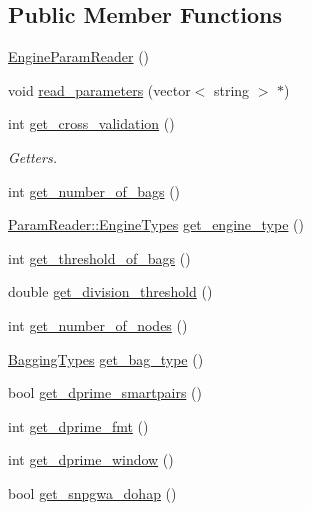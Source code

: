 \subsection*{Public Member Functions}
\begin{DoxyCompactItemize}
\item 
\hyperlink{classEngineParamReader_a0fcc8aa5dcc6a42dc88e94f7177d4322}{EngineParamReader} ()
\item 
void \hyperlink{classEngineParamReader_a6205586b208453840260a6203f605037}{read\_\-parameters} (vector$<$ string $>$ $\ast$)
\item 
int \hyperlink{classEngineParamReader_a1c0d37ffe417acf63b4eec01ca0d3836}{get\_\-cross\_\-validation} ()
\begin{DoxyCompactList}\small\item\em Getters. \item\end{DoxyCompactList}\item 
int \hyperlink{classEngineParamReader_a4338ed4d4978b04d6368cb10da68ccbd}{get\_\-number\_\-of\_\-bags} ()
\item 
\hyperlink{classParamReader_ade771142042ad0251f905f38248ae9df}{ParamReader::EngineTypes} \hyperlink{classEngineParamReader_a0e58d3172ab16c243a207651cb39cae0}{get\_\-engine\_\-type} ()
\item 
int \hyperlink{classEngineParamReader_aaf990b2dfcdb336b1ae0ee368518bca5}{get\_\-threshold\_\-of\_\-bags} ()
\item 
double \hyperlink{classEngineParamReader_af2226b8cad9a09be1acb47244266ce70}{get\_\-division\_\-threshold} ()
\item 
int \hyperlink{classEngineParamReader_a70ca973f1da2ca59547f9ac87ed83558}{get\_\-number\_\-of\_\-nodes} ()
\item 
\hyperlink{classEngineParamReader_ab2ee80aa67ba657beddf852c526e1a3d}{BaggingTypes} \hyperlink{classEngineParamReader_a73bbd8a96eb9c000aace5cb69d899f34}{get\_\-bag\_\-type} ()
\item 
bool \hyperlink{classEngineParamReader_a466e0c76542221a4e0d98b91a670cc75}{get\_\-dprime\_\-smartpairs} ()
\item 
int \hyperlink{classEngineParamReader_a1bf555e1267a06976f5241e8aa46e5d9}{get\_\-dprime\_\-fmt} ()
\item 
int \hyperlink{classEngineParamReader_a27e98726d5628e58e036c5f3a5d53a8f}{get\_\-dprime\_\-window} ()
\item 
bool \hyperlink{classEngineParamReader_ac4beadc882ffad47d90c2a4a6b6f1b44}{get\_\-snpgwa\_\-dohap} ()

\end{DoxyCompactItemize}
